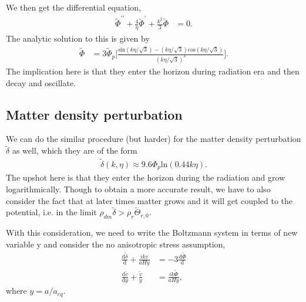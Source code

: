 \documentclass[a4paper, 12pt]{article}
\begin{document}
{{          We then get the differential equation, 
          \begin{align}
            \label{small scales equation}
              \tilde{\Phi}^{\prime \prime} + \frac{4}{\eta}
              \tilde{\Phi}^{\prime} + \frac{k^2}{3} \tilde{\Phi}
              &= 0.
          \end{align}
          The analytic solution to this is given by 
          \begin{align}
            \label{analytic to small scales evolution}
            \tilde{\Phi} &= 3 \tilde{\Phi}_{p}
            \bigg[\frac{\mathrm{sin}(k \eta / \sqrt{3} ) - (k
            \eta / \sqrt{3} ) \mathrm{cos}(k \eta / \sqrt{3} )  }{
            (k \eta / \sqrt{3} )^3} \bigg].
          \end{align} The implication here is that they enter the
          horizon during radiation era and then decay and
          oscillate. 
          \subsection{Matter density perturbation}%
            \label{sub:Matter density perturbation}
            We can do the similar procedure (but harder) for the
            matter density perturbation \( \tilde{\delta} \) as
            well, which they are of the form 
            \begin{align}
              \label{matter density pert solution}
              \tilde{\delta}(k, \eta) \approx 9.6 \Phi_{p}
              \mathrm{ln}(0.44 k \eta).
            \end{align} The upshot here is that they enter the
            horizon during the radiation and grow logarithmically.
            Though to obtain a more accurate result, we have to
            also consider the fact that at later times matter
            grows and it will get coupled to the potential, i.e.
            in the limit \( \rho_{dm} \tilde{\delta} > \rho_{r}
            \tilde{\Theta}_{r, 0} \). 

            With this consideration, we need to write the
            Boltzmann system in terms of new variable y and
            consider the no anisotropic stress assumption, 
            \begin{align}
              \label{new variable y and no anisotropic stress}
              \frac{\mathrm{d}\tilde{\delta}}{\mathrm{d}} +
              \frac{i k v}{a H y} &=  - 3
              \frac{\mathrm{d}\tilde{\Phi}}{\mathrm{d}} \\ 
              \frac{\mathrm{d}\tilde{v}}{\mathrm{d}y} +
              \frac{\tilde{v}}{y} &= \frac{ik \tilde{\Phi}}{a H
              y}, 
            \end{align} where \(  y = a / a_{eq} \).

}}
\end{document}
